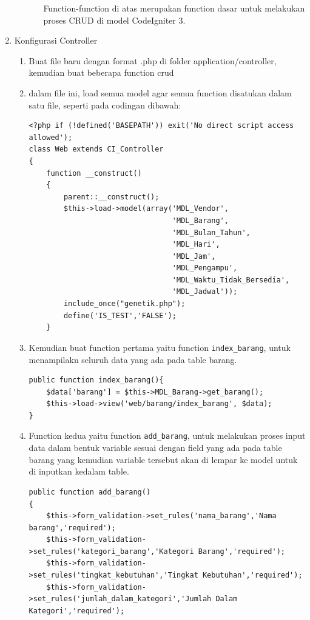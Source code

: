 \begin{enumerate}
\begin{enumerate}
\begin{enumerate}
            \par Function-function di atas merupakan function dasar untuk melakukan proses CRUD di model CodeIgniter 3.
        \end{enumerate}
    \end{enumerate}
    
    \item Konfigurasi Controller
    \begin{enumerate}
        \item Buat file baru dengan format .php di folder application/controller, kemudian buat beberapa function crud
        \item dalam file ini, load semua model agar semua function disatukan dalam satu file, seperti pada codingan dibawah:
\begin{lstlisting}
<?php if (!defined('BASEPATH')) exit('No direct script access allowed');
class Web extends CI_Controller
{
	function __construct()
    {
        parent::__construct();
		$this->load->model(array('MDL_Vendor',
								 'MDL_Barang',
								 'MDL_Bulan_Tahun',
								 'MDL_Hari',
								 'MDL_Jam',
								 'MDL_Pengampu',
								 'MDL_Waktu_Tidak_Bersedia',
								 'MDL_Jadwal'));
		include_once("genetik.php");
		define('IS_TEST','FALSE');
    }
\end{lstlisting}
    		
    	\item Kemudian buat function pertama yaitu function \verb|index_barang|, untuk menampilakn seluruh data yang ada pada table barang.
\begin{lstlisting}
public function index_barang(){
    $data['barang'] = $this->MDL_Barang->get_barang();
    $this->load->view('web/barang/index_barang', $data);
}
\end{lstlisting}
    		
        \item Function kedua yaitu function \verb|add_barang|, untuk melakukan proses input data dalam bentuk variable sesuai dengan field yang ada pada table barang  yang kemudian variable tersebut akan di lempar ke model untuk di inputkan kedalam table.
\begin{lstlisting}
public function add_barang()
{
	$this->form_validation->set_rules('nama_barang','Nama barang','required');
	$this->form_validation->set_rules('kategori_barang','Kategori Barang','required');
	$this->form_validation->set_rules('tingkat_kebutuhan','Tingkat Kebutuhan','required');
	$this->form_validation->set_rules('jumlah_dalam_kategori','Jumlah Dalam Kategori','required');
	

\end{lstlisting}
\end{enumerate}
\end{enumerate}
